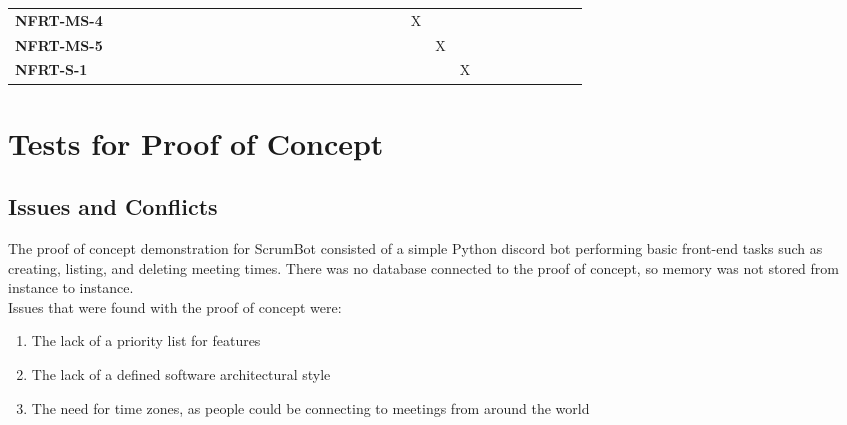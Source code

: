 \documentclass[12pt, titlepage]{article}
\begin{document}
\begin{landscape}
\begin{table}[H]
\begin{adjustbox}{width=\paperwidth}
\begin{tabular}{l|cccccccccccccccccccccc}
        \textbf{NFRT-MS-4}  & ~ & ~ & ~ & ~ & ~ & ~ & ~ & ~ & ~ & ~ & ~ & ~ & ~ & ~ & X & ~ & ~ & ~ & ~ & ~ & ~ & ~\\
        \textbf{NFRT-MS-5}  & ~ & ~ & ~ & ~ & ~ & ~ & ~ & ~ & ~ & ~ & ~ & ~ & ~ & ~ & ~ & X & ~ & ~ & ~ & ~ & ~ & ~\\
        \textbf{NFRT-S-1}   & ~ & ~ & ~ & ~ & ~ & ~ & ~ & ~ & ~ & ~ & ~ & ~ & ~ & ~ & ~ & ~ & X & ~ & ~ & ~ & ~ & ~\\
    \end{tabular}
    \end{adjustbox}
    \label{Traceability Matrix: Non-Functional Requirement}
\end{table}
\end{landscape}

\section{Tests for Proof of Concept}

\subsection{Issues and Conflicts}
The proof of concept demonstration for ScrumBot consisted of a simple Python discord bot performing basic front-end tasks such as creating, listing, and deleting meeting times. There was no database connected to the proof of concept, so memory was not stored from instance to instance.\\
\noindent Issues that were found with the proof of concept were:
\begin{enumerate}
    \item The lack of a priority list for features
    \item The lack of a defined software architectural style
    \item The need for time zones, as people could be connecting to meetings from around the world
\end{enumerate}
\end{document}

